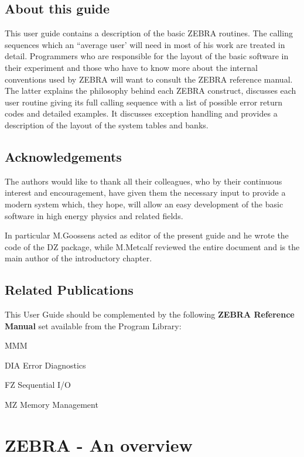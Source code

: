 \section*{About this guide}
\par This user guide contains a description of the basic
ZEBRA routines. The
calling sequences which an ``average user'
will need in most of his work are treated in
detail. Programmers who are
responsible for the layout of the basic software in their experiment
and those who
have to know more about the internal conventions used by ZEBRA
will want to consult the ZEBRA reference manual.
The latter explains the
philosophy behind each ZEBRA construct, discusses each user routine
giving its full calling sequence with
a list of possible error return codes and detailed examples.
It discusses exception handling and provides a description
of the layout of the system tables and banks.
\section*{Acknowledgements}
\par The authors would like to thank all their colleagues, who by their
continuous interest and encouragement, have given them the
necessary input to provide a modern system which, they hope, will allow
an easy development of the basic software
in high energy physics and related fields.
\par In particular
M.Goossens acted as editor of the present guide and he wrote the code
of the DZ package, while
M.Metcalf reviewed the entire document and
is the main author of the introductory chapter.
\section*{Related Publications}
\par This User Guide should be complemented by the following
{\bf ZEBRA Reference Manual} set available from the
Program Library:
\begin{DL}{MMM}
\item[DIA]Error Diagnostics
\item[FZ]Sequential I/O
\item[MZ]Memory Management
\end{DL}
\tableofcontents
\listoffigures
\chapter{ZEBRA - An overview}
